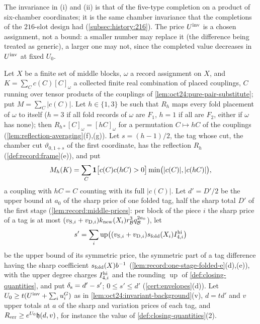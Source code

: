 The invariance in (i) and (ii) is that of the five-type completion on a
product of six-chamber coordinates; it is the same chamber invariance that the
completions of the $216$-slot design had (\cref{subsec:history:216}). The price
$U^{\mathrm{inv}}$ is a chosen assignment, not a bound: a smaller number may replace it (the
difference being treated as generic), a larger one may not, since the completed
value decreases in $U^{\mathrm{inv}}$ at fixed $U_0$.

\begin{lemma}
\label{lem:orbit-coupon}
Let $X$ be a finite set of middle blocks, $\omega$ a record assignment on $X$, and
$K=\sum_Cc(C)[C]_\omega$ a collected finite real combination of placed couplings, $C$
running over tensor products of the couplings of \cref{lem:oct24:pure-pair-substitute};
put $M=\sum_C|c(C)|$. Let $h\in\{1,3\}$ be such that $R_h$ maps every fold placement of
$\omega$ to itself ($h=3$ if all fold records of $\omega$ are $F_1$, $h=1$ if all are
$F_2$, either if $\omega$ has none); then $R_{h*}[C]_\omega=[hC]_\omega$ for a permutation
$C\mapsto hC$ of the couplings (\cref{lem:reflection-averaging}(f),(g)). Let
$s=(h-1)/2$, the tag whose cut, the chamber cut $\vartheta_{0,1+s}$ of the first
coordinate, has the reflection $R_h$ (\cref{def:record:frame}(e)), and put
\[
 M_h(K)=\sum_C\mathbf 1\bigl[c(C)c(hC)>0\bigr]\min\bigl(|c(C)|,|c(hC)|\bigr),
\]
a coupling with $hC=C$ counting with its full $|c(C)|$. Let $d'=D'/2$ be the upper
bound at $a_0$ of the sharp price of one folded tag, half the sharp total $D'$ of the
first stage (\cref{lem:record:middle-prices}: per block of the piece $i$ the sharp
price of a tag is at most $(v_{{\rm S},i}+v_{{\rm D},i})k_{\rm new}(X_i)r_\mathcal B^3q_\mathcal B^{2a_0}$), let
\[
 s'=\sum_i\operatorname{up}\bigl((v_{{\rm S},i}+v_{{\rm D},i})s_{\rm fold}(X_i)I^{\rm hi}_{4,i}\bigr)
\]
be the upper bound of its symmetric price, the symmetric part of a tag difference
having the sharp coefficient $s_{\rm fold}(X)b^{-1}$
(\cref{lem:record:one-stage-folded-e}(d),(e)), with the upper degree charges
$I^{\rm hi}_{4,i}$ and the rounding $\operatorname{up}$ of \cref{def:closing-quantities},
and put $\delta_{\rm s}=d'-s'$; $0\le s'\le d'$ (\cref{cert:envelopes}(d)). Let
$U_0\ge t(U^{\mathrm{inv}}+\sum_iu^G_i)$ as in \cref{lem:oct24:invariant-background}(v), $d=td'$ and
$v$ upper totals at $a$ of the sharp and variation prices of each tag, and
$R_{\rm err}\ge e^{U_0}\mathfrak h(d,v)$, for instance the value of
\cref{def:closing-quantities}(2).
\begin{enumerate}[label=(\roman*)]

\end{enumerate}
\end{lemma}
